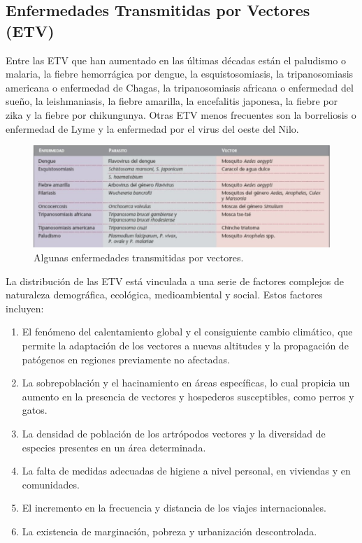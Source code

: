 \subsection{Enfermedades Transmitidas por Vectores (ETV)}
Entre las ETV que han aumentado en las últimas décadas están el 
paludismo o malaria, la fiebre hemorrágica por dengue, la esquistosomiasis, la tripanosomiasis americana 
o enfermedad de Chagas, la tripanosomiasis africana o enfermedad del sueño, la leishmaniasis, la fiebre 
amarilla, la encefalitis japonesa, la fiebre por zika  y la fiebre por chikungunya. Otras ETV menos frecuentes 
son la borreliosis o enfermedad de  Lyme y la enfermedad por el  virus del oeste del Nilo.\autocite{Torres2020}\\

\begin{figure}[htb]
    \centering
    \includegraphics[width=1\textwidth]{Graphics/EnfVec.jpeg}
    \caption{Algunas enfermedades transmitidas por vectores.\autocite{Tercero2008}}
\end{figure}

La distribución de las ETV está vinculada a una serie de factores complejos 
de naturaleza demográfica, ecológica, medioambiental y social. Estos factores incluyen:
\begin{enumerate}
    \item El fenómeno del calentamiento global y el consiguiente cambio climático, que permite la adaptación de los vectores a nuevas altitudes y la propagación de patógenos en regiones previamente no afectadas.
    \item La sobrepoblación y el hacinamiento en áreas específicas, lo cual propicia un aumento en la presencia de vectores y hospederos susceptibles, como perros y gatos.
    \item La densidad de población de los artrópodos vectores y la diversidad de especies presentes en un área determinada.
    \item La falta de medidas adecuadas de higiene a nivel personal, en viviendas y en comunidades.
    \item El incremento en la frecuencia y distancia de los viajes internacionales.
    \item La existencia de marginación, pobreza y urbanización descontrolada.
\end{enumerate}

